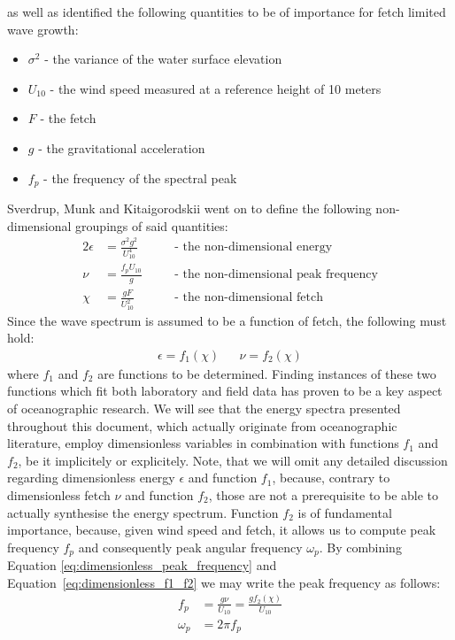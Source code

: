 \cite{report:SverdrupMunk1947} as well as \cite{article:Kitaigorodskii1962,book:Kitaigorodskii1970} 
identified the following quantities to be of importance for fetch limited wave
growth:
\begin{itemize}
 \item $\sigma^2$ - the variance of the water surface elevation
 \item $U_{10}$ - the wind speed measured at a reference height of 10 meters
 \item $F$ - the fetch
 \item $g$ - the gravitational acceleration
 \item $f_p$ - the frequency of the spectral peak
\end{itemize}
Sverdrup, Munk and Kitaigorodskii went on to define the following
non-dimensional groupings of said quantities:
\begin{alignat}{2}
 \epsilon &= \frac{\sigma^2 g^2}{U_{10}^{4}} \quad && \text{- the 
non-dimensional energy}\\
 \nu &= \frac{f_p U_{10}}{g} \quad && \text{- the non-dimensional peak 
frequency} \label{eq:dimensionless_peak_frequency} \\
 \chi &= \frac{gF}{U_{10}^{2}} \quad && \text{- the non-dimensional fetch} 
\label{eq:dimensionless_fetch}
\end{alignat}
Since the wave spectrum is assumed to be a function of fetch, the following 
must hold: 
\begin{align}
\label{eq:dimensionless_f1_f2}
 \epsilon = f_1(\chi) && \nu = f_2(\chi)
\end{align}
where $f_1$ and $f_2$ are functions to be determined. Finding instances of 
these two functions which fit both laboratory and field data has proven to be a 
key aspect of oceanographic research. We will see that the energy spectra
presented throughout this document, which actually originate from oceanographic
literature, employ dimensionless variables in combination with functions $f_1$
and $f_2$, be it implicitely or explicitely. Note, that we will omit any
detailed discussion regarding dimensionless energy $\epsilon$ and function
$f_1$, because, contrary to dimensionless fetch $\nu$ and function $f_2$, those
are not a prerequisite to be able to actually synthesise the energy spectrum.
Function $f_2$ is of fundamental importance, because, given wind speed and 
fetch, it allows us to compute peak frequency $f_p$ and consequently peak 
angular frequency $\omega_p$. By combining Equation 
\ref{eq:dimensionless_peak_frequency} and Equation~\ref{eq:dimensionless_f1_f2}
we may write the peak frequency as follows:
\begin{align}
 f_p &= \frac{g\nu}{U_{10}} = \frac{gf_2(\chi)}{U_{10}} 
\label{eq:f_p_from_dimensionless}\\
 \omega_p &= 2\pi f_p \label{eq:omega_p_from_dimensionless}
\end{align}
%

